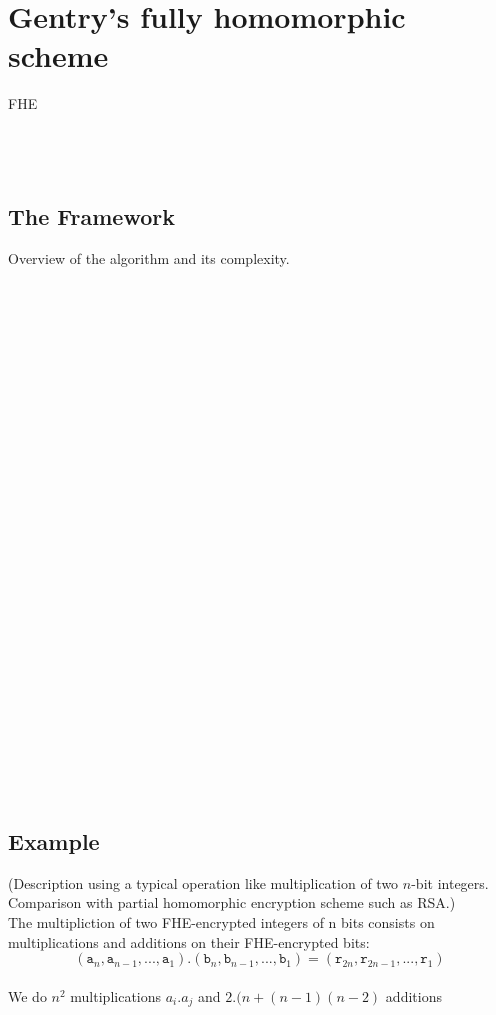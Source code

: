 \documentclass{acm_proc_article-sp}
\begin{document}
\section{Gentry's fully homomorphic scheme}
 FHE\\\\\\\
\subsection{The Framework}
Overview of the algorithm and its complexity. 
 \\\\\\\\\\\\\\\\\\\\\\\\\\\\\\\\\\\\\\\\\\\\\\\\\\\\\\\\

\subsection{Example}
(Description using a typical operation like multiplication of two $n$-bit integers. Comparison with partial homomorphic encryption scheme such as RSA.)\\
The multipliction of two FHE-encrypted integers of n bits consists on multiplications and additions on their FHE-encrypted bits: \[(\texttt{a}_{n},\texttt{a}_{n-1}, ... ,\texttt{a}_{1}) . (\texttt{b}_{n},\texttt{b}_{n-1}, ... ,\texttt{b}_{1}) = (\texttt{r}_{2n},\texttt{r}_{2n-1}, ... ,\texttt{r}_{1})\] \\
We do $ n^{2}$ multiplications $ a_i.a_j$ and $ 2.(n + (n-1)(n-2)$ additions
\end{document}
